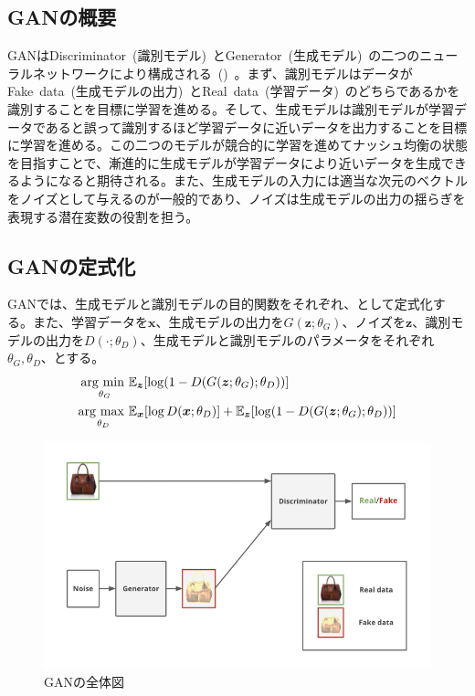 \subsection{GANの概要}

GANはDiscriminator~(識別モデル)~とGenerator~(生成モデル)~の二つのニューラルネットワークにより構成される~()~。まず、識別モデルはデータがFake~data~(生成モデルの出力)~とReal~data~(学習データ)~のどちらであるかを識別することを目標に学習を進める。そして、生成モデルは識別モデルが学習データであると誤って識別するほど学習データに近いデータを出力することを目標に学習を進める。この二つのモデルが競合的に学習を進めてナッシュ均衡の状態を目指すことで、漸進的に生成モデルが学習データにより近いデータを生成できるようになると期待される。また、生成モデルの入力には適当な次元のベクトルをノイズとして与えるのが一般的であり、ノイズは生成モデルの出力の揺らぎを表現する潜在変数の役割を担う。

\subsection{GANの定式化}

GANでは、生成モデルと識別モデルの目的関数をそれぞれ、として定式化する。また、学習データを$\boldsymbol{x}$、生成モデルの出力を$G(\boldsymbol{z};\theta_G)$、ノイズを$\boldsymbol{z}$、識別モデルの出力を$D(\cdot;\theta_D)$、生成モデルと識別モデルのパラメータをそれぞれ$\theta_G,\theta_D$、とする。
\begin{align}
    \label{eq:GAN_G}
    \mathop{\mathrm{arg~min~}}\limits _{\theta_G}& \mathbb{E}_{\boldsymbol{z}}[\log (1-D(G(\boldsymbol{z};\theta_G);\theta_D))]\\
    \label{eq:GAN_D}
    \mathop{\mathrm{arg~max~}}\limits _{\theta_D}& \mathbb{E}_{\boldsymbol{x}}[\log D(\boldsymbol{x};\theta_D)]+\mathbb{E}_{\boldsymbol{z}}[\log (1-D(G(\boldsymbol{z};\theta_G);\theta_D))]
\end{align}

\begin{figure}[b]
\centering
\includegraphics[width=0.9\columnwidth]{figure/GAN_net.png}
\caption{GANの全体図}
\label{fig:GAN_net}
\end{figure}


